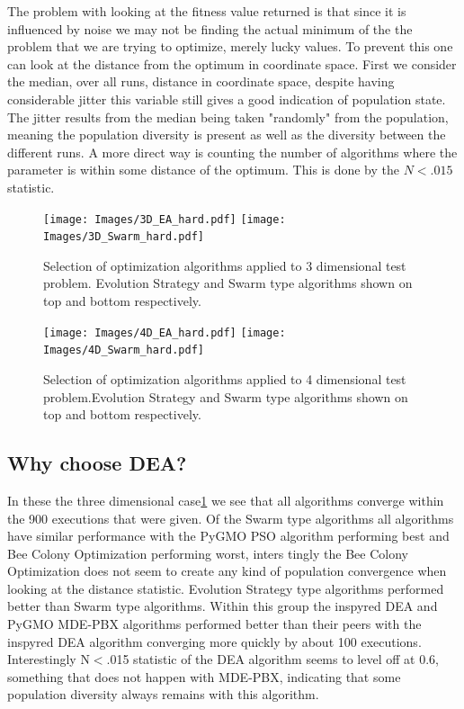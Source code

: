 \documentclass[a4paper,titlepage]{report}
\begin{document}
The problem with looking at the fitness value returned is that since it is influenced by noise we may not be finding the actual minimum of the the problem that we are trying to optimize, merely lucky values. To prevent this one can look at the distance from the optimum in coordinate space. First we consider the median, over all runs, distance in coordinate space, despite having considerable jitter this variable still gives a good indication of population state. The jitter results from the median being taken "randomly" from the population, meaning the population diversity is present as well as the diversity between the different runs. A  more direct way is counting the number of algorithms where the parameter is within some distance of the optimum. This is done by the $N<.015$ statistic.

\begin{figure}[htb]
\centering
\texttt{[image: Images/3D\_EA\_hard.pdf]}
\vspace{0.5cm}
\texttt{[image: Images/3D\_Swarm\_hard.pdf]}
\caption{Selection of optimization algorithms applied to 3 dimensional test problem. Evolution Strategy and Swarm type algorithms shown on top and bottom respectively.}
\label{fig: 3d_hard}
\end{figure}

\begin{figure}[htb]
\centering
\texttt{[image: Images/4D\_EA\_hard.pdf]}
\vspace{0.5cm}
\texttt{[image: Images/4D\_Swarm\_hard.pdf]}
\caption{Selection of optimization algorithms applied to 4 dimensional test problem.Evolution Strategy and Swarm type algorithms shown on top and bottom respectively.}
\label{fig: 4d_hard}
\end{figure}

\subsection{Why choose DEA?}
In these the three dimensional case\ref{fig: 3d_hard} we see that all algorithms converge within the 900 executions that were given. Of the Swarm type algorithms all algorithms have similar performance with the PyGMO PSO algorithm performing best and Bee Colony Optimization performing worst, inters tingly the Bee Colony Optimization does not seem to create any kind of population convergence when looking at the distance statistic. Evolution Strategy type algorithms performed better than Swarm type algorithms. Within this group the inspyred DEA and PyGMO MDE-PBX algorithms performed better than their peers with the inspyred DEA algorithm converging more quickly by about 100 executions. Interestingly N$<$.015 statistic of the DEA algorithm seems to level off at 0.6, something that does not happen with MDE-PBX, indicating that some population diversity always remains with this algorithm.
\end{document}
